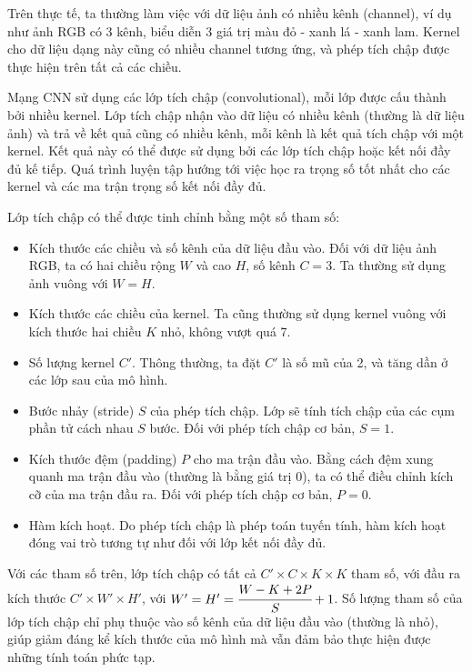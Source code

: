 \documentclass[12pt]{extreport}
\begin{document}
Trên thực tế, ta thường làm việc với dữ liệu ảnh có nhiều kênh (channel), ví dụ như ảnh RGB có 3 kênh, biểu diễn 3 giá trị màu đỏ - xanh lá - xanh lam. Kernel cho dữ liệu dạng này cũng có nhiều channel tương ứng, và phép tích chập được thực hiện trên tất cả các chiều.

Mạng CNN sử dụng các lớp tích chập (convolutional), mỗi lớp được cấu thành bởi nhiều kernel. Lớp tích chập nhận vào dữ liệu có nhiều kênh (thường là dữ liệu ảnh) và trả về kết quả cũng có nhiều kênh, mỗi kênh là kết quả tích chập với một kernel. Kết quả này có thể được sử dụng bởi các lớp tích chập hoặc kết nối đầy đủ kế tiếp. Quá trình luyện tập hướng tới việc học ra trọng số tốt nhất cho các kernel và các ma trận trọng số kết nối đầy đủ.

Lớp tích chập có thể được tinh chỉnh bằng một số tham số:
\begin{itemize}
    \item Kích thước các chiều và số kênh của dữ liệu đầu vào. Đối với dữ liệu ảnh RGB, ta có hai chiều rộng $ W $ và cao $ H $, số kênh $ C = 3 $. Ta thường sử dụng ảnh vuông với $ W = H $.
    \item Kích thước các chiều của kernel. Ta cũng thường sử dụng kernel vuông với kích thước hai chiều $ K $ nhỏ, không vượt quá 7.
    \item Số lượng kernel $ C' $. Thông thường, ta đặt $ C' $ là số mũ của 2, và tăng dần ở các lớp sau của mô hình.
    \item Bước nhảy (stride) $ S $ của phép tích chập. Lớp sẽ tính tích chập của các cụm phần tử cách nhau $ S $ bước. Đối với phép tích chập cơ bản, $ S = 1 $.
    \item Kích thước đệm (padding) $ P $ cho ma trận đầu vào. Bằng cách đệm xung quanh ma trận đầu vào (thường là bằng giá trị 0), ta có thể điều chỉnh kích cỡ của ma trận đầu ra. Đối với phép tích chập cơ bản, $ P = 0 $.
    \item Hàm kích hoạt. Do phép tích chập là phép toán tuyến tính, hàm kích hoạt đóng vai trò tương tự như đối với lớp kết nối đầy đủ.
\end{itemize}

Với các tham số trên, lớp tích chập có tất cả $ C' \times C \times K \times K $ tham số, với đầu ra kích thước $ C' \times W' \times H' $, với $ W' = H' = \cfrac{W - K + 2P}{S} + 1 $. Số lượng tham số của lớp tích chập chỉ phụ thuộc vào số kênh của dữ liệu đầu vào (thường là nhỏ), giúp giảm đáng kể kích thước của mô hình mà vẫn đảm bảo thực hiện được những tính toán phức tạp.
\end{document}
